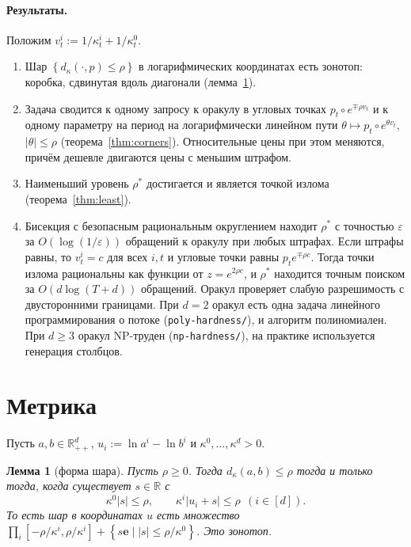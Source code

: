 \documentclass[a4paper,11pt]{article}
\theoremstyle{plain}
\newtheorem{lemma}[theorem]{Лемма}
\theoremstyle{definition}
\theoremstyle{remark}
\newcommand{\R}{\mathbb{R}}
\newcommand{\abs}[1]{\left\lvert #1 \right\rvert}
\newcommand{\set}[1]{\left\{ #1 \right\}}
\newcommand{\Rpp}[1][2]{\R^{#1}_{++}} %
\begin{document}
\paragraph{Результаты.} Положим $v^i_t:=1/\kappa^i_t+1/\kappa^0_t$.
\begin{enumerate}[label=(\roman*)]
    \item Шар $\set{d_\kappa(\cdot,p)\le\rho}$ в логарифмических координатах есть зонотоп: коробка, сдвинутая вдоль диагонали (лемма~\ref{lem:shape}).
    \item Задача сводится к одному запросу к оракулу в угловых точках $p_t\circ e^{\mp\rho v_t}$ и к одному параметру на период на логарифмически линейном пути $\theta\mapsto p_t\circ e^{\theta v_t}$, $\abs{\theta}\le\rho$ (теорема~\ref{thm:corners}). Относительные цены при этом меняются, причём дешевле двигаются цены с меньшим штрафом.
    \item Наименьший уровень $\rho^*$ достигается и является точкой излома (теорема~\ref{thm:least}).
    \item Бисекция с безопасным рациональным округлением находит $\rho^*$ с точностью $\varepsilon$ за $O(\log(1/\varepsilon))$ обращений к оракулу при любых штрафах. Если штрафы равны, то $v^i_t=c$ для всех $i,t$ и угловые точки равны $p_te^{\mp\rho c}$. Тогда точки излома рациональны как функции от $z=e^{2\rho c}$, и $\rho^*$ находится точным поиском за $O(d\log(T+d))$ обращений. Оракул проверяет слабую разрешимость с двусторонними границами. При $d=2$ оракул есть одна задача линейного программирования о потоке (\texttt{poly-hardness/}), и алгоритм полиномиален. При $d\ge3$ оракул NP-труден (\texttt{np-hardness/}), на практике используется генерация столбцов.
\end{enumerate}

\section{Метрика}

Пусть $a,b\in\Rpp[d]$, $u_i:=\ln a^i-\ln b^i$ и $\kappa^0,\dots,\kappa^d>0$.

\begin{lemma}[форма шара]\label{lem:shape}
    Пусть $\rho\ge0$. Тогда $d_\kappa(a,b)\le\rho$ тогда и только тогда, когда существует $s\in\R$ с
    \[
        \kappa^0\abs{s}\le\rho,\qquad\kappa^i\abs{u_i+s}\le\rho\ \ (i\in[d]).
    \]
    То есть шар в координатах $u$ есть множество $\prod_i[-\rho/\kappa^i,\rho/\kappa^i]+\set{s\mathbf e\mid\abs{s}\le\rho/\kappa^0}$. Это зонотоп.
\end{lemma}
\end{document}
